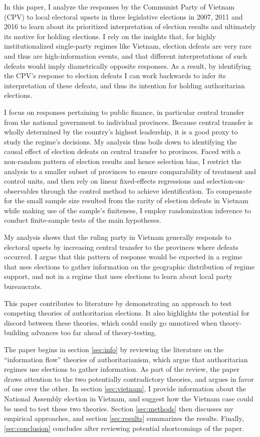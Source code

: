 \documentclass[12pt]{article}\usepackage[]{graphicx}\usepackage[]{color}
\newcommand{\1}{\mathbbm{1}}
\begin{document}
In this paper, I analyze the responses by the Communist Party of Vietnam (CPV) to local electoral upsets in three legislative elections in 2007, 2011 and 2016 to learn about its prioritized interpretation of election results and ultimately its motive for holding elections. I rely on the insights that, for highly institutionalized single-party regimes like Vietnam, election defeats are very rare and thus are high-information events, and that different interpretations of such defeats would imply diametrically opposite responses. As a result, by identifying the CPV's response to election defeats I can work backwards to infer its interpretation of these defeats, and thus its intention for holding authoritarian elections.

I focus on responses pertaining to public finance, in particular central transfer from the national government to individual provinces. Because central transfer is wholly determined by the country's highest leadership, it is a good proxy to study the regime's decisions. My analysis thus boils down to identifying the causal effect of election defeats on central transfer to provinces. Faced with a non-random pattern of election results and hence selection bias, I restrict the analysis to a smaller subset of provinces to ensure comparability of treatment and control units, and then rely on linear fixed-effects regressions and selection-on-observables through the  control method to achieve identification. To compensate for the small sample size resulted from the rarity of election defeats in Vietnam while making use of the sample's finiteness, I employ randomization inference to conduct finite-sample tests of the main hypotheses.

My analysis shows that the ruling party in Vietnam generally responds to electoral upsets by increasing central transfer to the provinces where defeats occurred. I argue that this pattern of response would be expected in a regime that uses elections to gather information on the geographic distribution of regime support, and not in a regime that uses elections to learn about local party bureaucrats.

This paper contributes to literature by demonstrating an approach to test competing theories of authoritarian elections. It also highlights the potential for discord between these theories, which could easily go unnoticed when theory-building advances too far ahead of theory-testing. 

The paper begins in section \ref{sec:info} by reviewing the literature on the ``information flow'' theories of authoritarianism, which argue that authoritarian regimes use elections to gather information. As part of the review, the paper draws attention to the two potentially contradictory theories, and argues in favor of one over the other. In section \ref{sec:vietnam}, I provide information about the National Assembly election in Vietnam, and suggest how the Vietnam case could be used to test these two theories. Section \ref{sec:methods} then discusses my empirical approaches, and section \ref{sec:results} summarizes the results. Finally, \ref{sec:conclusion} concludes after reviewing potential shortcomings of the paper.
\end{document}
